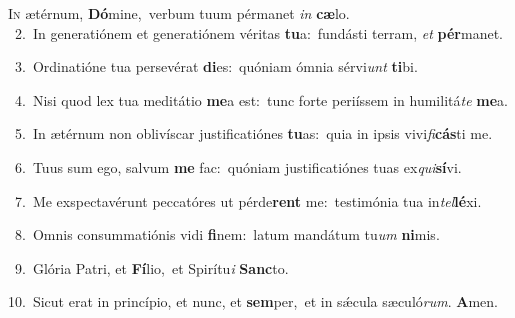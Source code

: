 \lettrine{\initial\textcolor{\initialcolor}{I}}{n} ætérnum, \textbf{Dó}\-mine,~\star verbum tuum pérmanet \textit{in} \textbf{cæ}\-lo.\\
{\numbfont\textcolor{\numbcolor}{~2.}}~In generatiónem et generatiónem véritas \textbf{tu}\-a:~\star fundásti terram, \textit{et} \textbf{pér}\-manet.\par
{\numbfont\textcolor{\numbcolor}{~3.}}~Ordinatióne tua persevérat \textbf{di}\-es:~\star quóniam ómnia sérvi\textit{unt} \textbf{ti}\-bi.\par
{\numbfont\textcolor{\numbcolor}{~4.}}~Nisi quod lex tua meditátio \textbf{me}\-a est:~\star tunc forte periíssem in humilitá\textit{te} \textbf{me}\-a.\par
{\numbfont\textcolor{\numbcolor}{~5.}}~In ætérnum non oblivíscar justificatiónes \textbf{tu}\-as:~\star quia in ipsis vivi\-\textit{fi}\-\textbf{cás}ti me.\par
{\numbfont\textcolor{\numbcolor}{~6.}}~Tuus sum ego, salvum \textbf{me} fac:~\star quóniam justificatiónes tuas ex\-\textit{qui}\-\textbf{sí}vi.\par
{\numbfont\textcolor{\numbcolor}{~7.}}~Me exspectavérunt peccatóres ut pérde\textbf{rent} me:~\star testimónia tua in\-\textit{tel}\-\textbf{lé}xi.\par
{\numbfont\textcolor{\numbcolor}{~8.}}~Omnis consummatiónis vidi \textbf{fi}\-nem:~\star latum mandátum tu\textit{um} \textbf{ni}\-mis.\par
{\numbfont\textcolor{\numbcolor}{~9.}}~Glória Patri, et \textbf{Fí}\-lio,~\star et Spirítu\textit{i} \textbf{Sanc}\-to.\par
{\numbfont\textcolor{\numbcolor}{10.}}~Sicut erat in princípio, et nunc, et \textbf{sem}\-per,~\star et in sǽcula sæculó\-\textit{rum}\-. \textbf{A}\-men.\par
